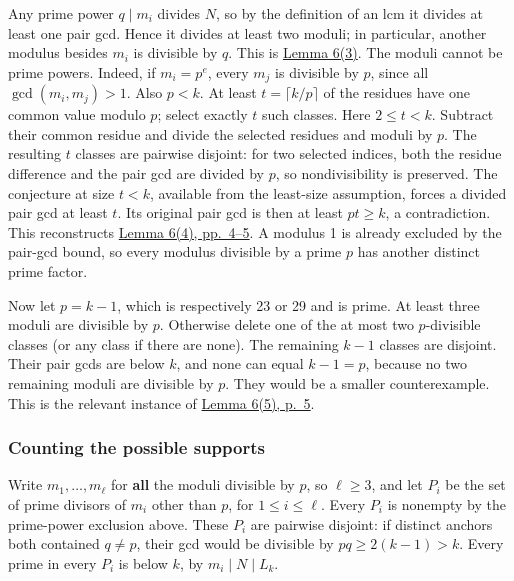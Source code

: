 \documentclass[11pt,a4paper]{article}
\begin{document}
Any prime power \(q\mid m_i\) divides \(N\), so by the definition of an lcm it divides at least one pair gcd. Hence it divides at least two moduli; in particular, another modulus besides \(m_i\) is divisible by \(q\). This is \href{https://arxiv.org/pdf/math/0604347v2}{Lemma 6(3)}. The moduli cannot be prime powers. Indeed, if \(m_i=p^e\), every \(m_j\) is divisible by \(p\), since all \(\gcd(m_i,m_j)>1\). Also \(p<k\). At least \(t=\lceil k/p\rceil\) of the residues have one common value modulo \(p\); select exactly \(t\) such classes. Here \(2\le t<k\). Subtract their common residue and divide the selected residues and moduli by \(p\). The resulting \(t\) classes are pairwise disjoint: for two selected indices, both the residue difference and the pair gcd are divided by \(p\), so nondivisibility is preserved. The conjecture at size \(t<k\), available from the least-size assumption, forces a divided pair gcd at least \(t\). Its original pair gcd is then at least \(pt\ge k\), a contradiction. This reconstructs \href{https://arxiv.org/pdf/math/0604347v2}{Lemma 6(4), pp.~4--5}. A modulus 1 is already excluded by the pair-gcd bound, so every modulus divisible by a prime \(p\) has another distinct prime factor.

Now let \(p=k-1\), which is respectively 23 or 29 and is prime. At least three moduli are divisible by \(p\). Otherwise delete one of the at most two \(p\)-divisible classes (or any class if there are none). The remaining \(k-1\) classes are disjoint. Their pair gcds are below \(k\), and none can equal \(k-1=p\), because no two remaining moduli are divisible by \(p\). They would be a smaller counterexample. This is the relevant instance of \href{https://arxiv.org/pdf/math/0604347v2}{Lemma 6(5), p.~5}.

\subsubsection{Counting the possible supports}\label{counting-the-possible-supports}

Write \(m_1,\ldots,m_\ell\) for \textbf{all} the moduli divisible by \(p\), so \(\ell\ge3\), and let \(P_i\) be the set of prime divisors of \(m_i\) other than \(p\), for \(1\le i\le\ell\). Every \(P_i\) is nonempty by the prime-power exclusion above. These \(P_i\) are pairwise disjoint: if distinct anchors both contained \(q\ne p\), their gcd would be divisible by \(pq\ge2(k-1)>k\). Every prime in every \(P_i\) is below \(k\), by \(m_i\mid N\mid L_k\).
\end{document}
